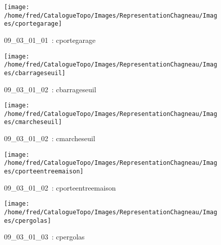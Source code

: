 \documentclass[12pt,titlepage]{book}
\begin{document}
\begin{figure}[h!]
  \begin{minipage}[t]{3cm}
    \begin{center}
      \texttt{[image: /home/fred/CatalogueTopo/Images/RepresentationChagneau/Images/cportegarage]}
      \caption[~09\_03\_01\_01]{\small{09\_03\_01\_01~:} \tiny{cportegarage}}\label{cportegarage}
    \end{center}
  \end{minipage}
  \begin{minipage}[t]{3cm}
    \begin{center}
      \texttt{[image: /home/fred/CatalogueTopo/Images/RepresentationChagneau/Images/cbarrageseuil]}
      \caption[~09\_03\_01\_02]{\small{09\_03\_01\_02~:} \tiny{cbarrageseuil}}\label{cbarrageseuil}
    \end{center}
  \end{minipage}
  \begin{minipage}[t]{3cm}
    \begin{center}
      \texttt{[image: /home/fred/CatalogueTopo/Images/RepresentationChagneau/Images/cmarcheseuil]}
      \caption[~09\_03\_01\_02]{\small{09\_03\_01\_02~:} \tiny{cmarcheseuil}}\label{cmarcheseuil}
    \end{center}
  \end{minipage}
  \begin{minipage}[t]{3cm}
    \begin{center}
      \texttt{[image: /home/fred/CatalogueTopo/Images/RepresentationChagneau/Images/cporteentreemaison]}
      \caption[~09\_03\_01\_02]{\small{09\_03\_01\_02~:} \tiny{cporteentreemaison}}\label{cporteentreemaison}
    \end{center}
  \end{minipage}
  \begin{minipage}[t]{3cm}
    \begin{center}
      \texttt{[image: /home/fred/CatalogueTopo/Images/RepresentationChagneau/Images/cpergolas]}
      \caption[~09\_03\_01\_03]{\small{09\_03\_01\_03~:} \tiny{cpergolas}}\label{cpergolas}
    \end{center}
  \end{minipage}
  \begin{minipage}[t]{3cm}
    \begin{center}

\end{center}
\end{minipage}
\end{figure}
\end{document}
